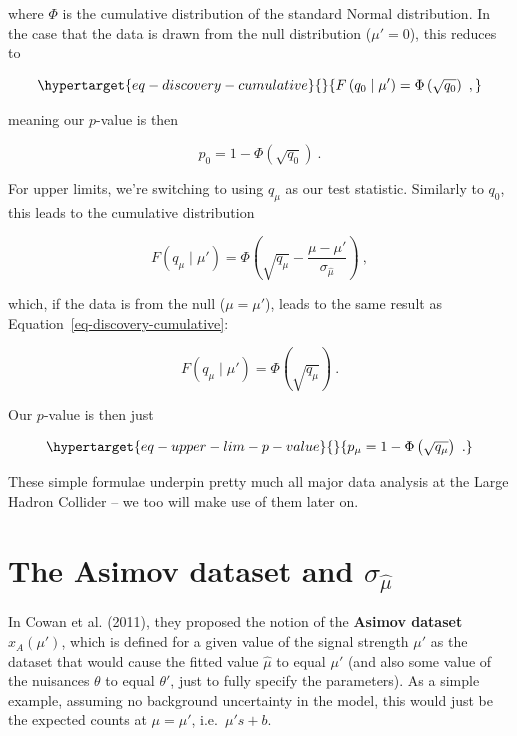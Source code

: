 \documentclass[
  11pt,
  numbers=noendperiod]{book}
\begin{document}
where \(\Phi\) is the cumulative distribution of the standard Normal
distribution. In the case that the data is drawn from the null
distribution (\(\mu'=0\)), this reduces to

\begin{equation}\protect\hypertarget{eq-discovery-cumulative}{}{
F\left(q_0 \mid \mu'\right)=\Phi\left(\sqrt{q_0}\right)~,
}\label{eq-discovery-cumulative}\end{equation}

meaning our \(p\)-value is then

\[
p_0 = 1 - \Phi\left(\sqrt{q_0}\right)~.
\]

For upper limits, we're switching to using \(q_\mu\) as our test
statistic. Similarly to \(q_0\), this leads to the cumulative
distribution

\[
F\left(q_\mu \mid \mu'\right)=\Phi\left(\sqrt{q_\mu}-\frac{\mu-\mu'}{\sigma_{\hat{\mu}}}\right)~,
\]

which, if the data is from the null (\(\mu=\mu'\)), leads to the same
result as Equation~\ref{eq-discovery-cumulative}:

\[
F\left(q_\mu \mid \mu'\right)=\Phi\left(\sqrt{q_\mu}\right)~.
\]

Our \(p\)-value is then just

\begin{equation}\protect\hypertarget{eq-upper-lim-p-value}{}{
p_\mu = 1 - \Phi\left(\sqrt{q_\mu}\right)~.
}\label{eq-upper-lim-p-value}\end{equation}

These simple formulae underpin pretty much all major data analysis at
the Large Hadron Collider -- we too will make use of them later on.

\hypertarget{the-asimov-dataset-and-sigma_hatmu}{%
\section{\texorpdfstring{The Asimov dataset and
\(\sigma_{\hat{\mu}}\)}{The Asimov dataset and \textbackslash sigma\_\{\textbackslash hat\{\textbackslash mu\}\}}}\label{the-asimov-dataset-and-sigma_hatmu}}

In Cowan et al. (2011), they proposed the notion of the \textbf{Asimov
dataset} \(x_A(\mu')\), which is defined for a given value of the signal
strength \(\mu'\) as the dataset that would cause the fitted value
\(\hat{\mu}\) to equal \(\mu'\) (and also some value of the nuisances
\(\theta\) to equal \(\theta'\), just to fully specify the parameters).
As a simple example, assuming no background uncertainty in the model,
this would just be the expected counts at \(\mu=\mu'\),
i.e.~\(\mu' s+b\).
\end{document}
